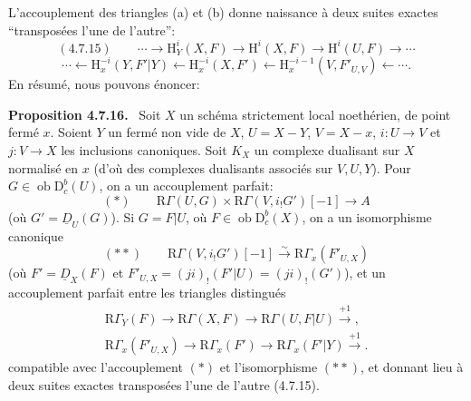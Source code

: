 \documentclass[11pt]{article}
\newenvironment{statement}[1]{\par\medskip\noindent\textbf{#1.}\ }{\par\medskip}
\renewcommand{\H}{\mathrm{H}}
\newcommand{\R}{\mathrm{R}}
\newcommand{\D}{\mathrm{D}}
\newcommand{\ob}{\operatorname{ob}}
\providecommand{\ob}{\operatorname{ob}}
\providecommand{\R}{\mathrm R}
\begin{document}
L'accouplement des triangles (a) et (b) donne naissance à deux suites exactes ``transposées l'une de l'autre'':
\[
(4.7.15)\qquad \cdots\longrightarrow \H_Y^i(X,F)\longrightarrow\H^i(X,F)\longrightarrow\H^i(U,F)\longrightarrow\cdots
\]
\[
\cdots\longleftarrow \H_x^{-i}(Y,F'|Y)\longleftarrow\H_x^{-i}(X,F')\longleftarrow\H_x^{-i-1}(V,F'_{U,V})\longleftarrow\cdots.
\]
En résumé, nous pouvons énoncer:

\begin{statement}{Proposition 4.7.16}
Soit $X$ un schéma strictement local noethérien, de point fermé $x$. Soient $Y$ un fermé non vide de $X$, $U=X-Y$, $V=X-x$, $i:U\to V$ et $j:V\to X$ les inclusions canoniques. Soit $K_X$ un complexe dualisant sur $X$ normalisé en $x$ (d'où des complexes dualisants associés sur $V,U,Y$). Pour $G\in\ob\D_c^b(U)$, on a un accouplement parfait:
\[
(*)\qquad \R\Gamma(U,G)\times\R\Gamma(V,i_!G')[-1]\longrightarrow A
\]
(où $G'=\underline{D}_U(G)$). Si $G=F|U$, où $F\in\ob\D_c^b(X)$, on a un isomorphisme canonique
\[
(**)\qquad \R\Gamma(V,i_!G')[-1]\xrightarrow{\sim}\R\Gamma_x(F'_{U,X})
\]
(où $F'=\underline{D}_X(F)$ et $F'_{U,X}=(ji)_!(F'|U)=(ji)_!(G')$), et un accouplement parfait entre les triangles distingués
\[
\begin{gathered}
\R\Gamma_Y(F)\longrightarrow \R\Gamma(X,F)\longrightarrow \R\Gamma(U,F|U)\xrightarrow{+1},\\
\R\Gamma_x(F'_{U,X})\longrightarrow \R\Gamma_x(F')\longrightarrow \R\Gamma_x(F'|Y)\xrightarrow{+1}.
\end{gathered}
\]
compatible avec l'accouplement $(*)$ et l'isomorphisme $(**)$, et donnant lieu à deux suites exactes transposées l'une de l'autre (4.7.15).
\end{statement}
\end{document}
